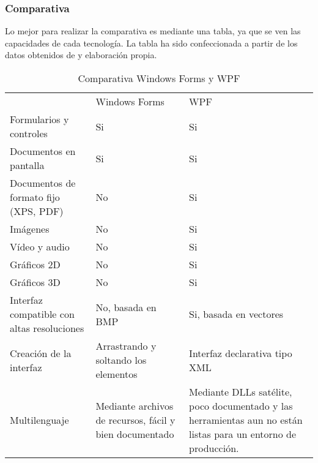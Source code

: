 \subsubsection{Comparativa}
Lo mejor para realizar la comparativa es mediante una tabla, ya que se ven las capacidades de cada tecnolog\'{i}a.
La tabla ha sido confeccionada a partir de los datos obtenidos de \cite{WPFvsWinForms:Comparative} y elaboraci\'{o}n propia.

\begin{table}[H]
    \begin{center}
        \begin{tabular}{|p{5cm} | p{4cm} | p{4cm}|}
            \rowcolor{darkgray}                         & \color{white}Windows Forms               & \color{white}WPF \\
            Formularios y controles                     & Si                                       & Si \\
            Documentos en pantalla                      & Si                                       & Si \\
            Documentos de formato fijo (XPS, PDF)       & No                                       & Si \\
            Im\'{a}genes                                & No                                       & Si \\
            V\'{i}deo y audio                           & No                                       & Si \\
            Gr\'{a}ficos 2D                             & No                                       & Si \\
            Gr\'{a}ficos 3D                             & No                                       & Si \\
            Interfaz compatible con altas resoluciones  & No, basada en BMP                        & Si, basada en vectores \\
            Creaci\'{o}n de la interfaz                 & Arrastrando y soltando los elementos     & Interfaz declarativa tipo XML \\
            Multilenguaje                               & Mediante archivos de recursos, f\'{a}cil y bien documentado & Mediante DLLs sat\'{e}lite, poco documentado y las herramientas aun no est\'{a}n listas para un entorno de producci\'{o}n. \\
            \hline
        \end{tabular}
    \end{center}
    \caption[Comparativa Windows Forms y WPF]{Comparativa Windows Forms y WPF}
    \label{ComparativaWPF}
\end{table}

